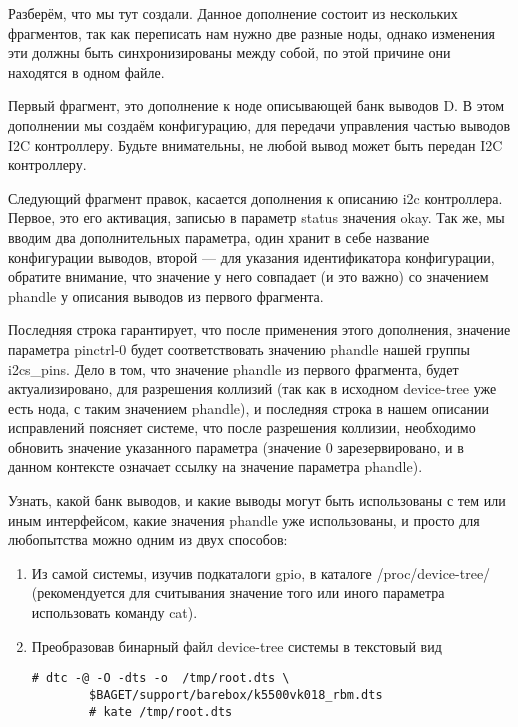 Разберём, что мы тут создали. Данное дополнение состоит из нескольких фрагментов, так как переписать нам нужно две разные ноды, однако изменения эти должны быть синхронизированы между собой, по этой причине они находятся в одном файле. 

Первый фрагмент, это дополнение к ноде описывающей банк выводов D. В этом дополнении мы создаём конфигурацию, для передачи управления частью выводов I2C контроллеру. Будьте внимательны, не любой вывод может быть передан I2C контроллеру. 

Следующий фрагмент правок, касается дополнения к описанию i2c контроллера. Первое, это его активация, записью в параметр status значения okay. Так же, мы вводим два дополнительных параметра, один хранит в себе название конфигурации выводов, второй — для указания идентификатора конфигурации, обратите внимание, что значение у него совпадает (и это важно) со значением phandle у описания выводов из первого фрагмента.

Последняя строка гарантирует, что после применения этого дополнения, значение параметра pinctrl-0 будет соответствовать значению phandle нашей группы i2cs\_pins. Дело в том, что значение phandle из первого фрагмента, будет  актуализировано, для разрешения коллизий (так как в исходном device-tree уже есть нода, с таким значением phandle), и последняя строка в нашем описании исправлений поясняет системе, что после разрешения коллизии, необходимо обновить значение указанного параметра (значение 0 зарезервировано, и в данном контексте означает ссылку на значение параметра phandle).  

Узнать, какой банк выводов, и какие выводы могут быть использованы с тем или иным интерфейсом, какие значения phandle уже использованы, и просто для любопытства можно одним из двух способов:

\begin{enumerate}
	\item Из самой системы, изучив подкаталоги gpio, в каталоге /proc/device-tree/ (рекомендуется для считывания значение того или иного параметра использовать команду cat). 
	
	\item Преобразовав бинарный файл device-tree системы в текстовый вид 
	\begin{lstlisting}[style=bash]
		# dtc -@ -O -dts -o  /tmp/root.dts \
		$BAGET/support/barebox/k5500vk018_rbm.dts
		# kate /tmp/root.dts
	\end{lstlisting}
\end{enumerate}


